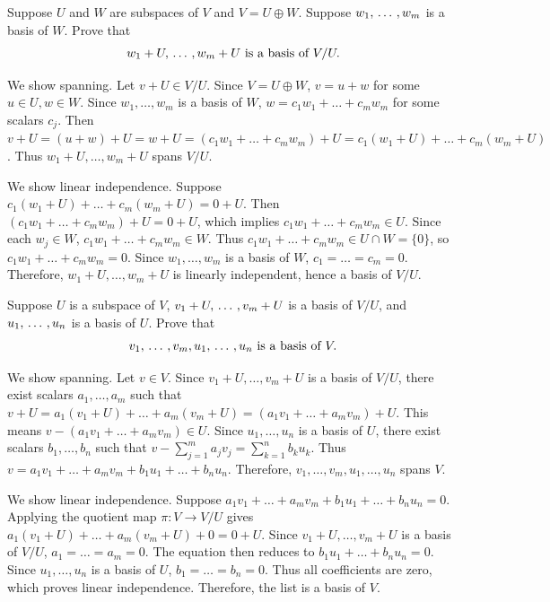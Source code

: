 \begin{xrcs}
  Suppose $U$ and $W$ are subspaces of $V$ and $V = U \oplus W$. Suppose $w_1, {\, \ldots \,\,}, w_m$ is a basis of $W$. Prove that
  \begin{equation}
    w_1 + U, {\, \ldots \,\,}, w_m + U \text{ is a basis of } V/U.
  \end{equation}

\begin{xprf}
  \StepOne We show spanning. Let $v + U \in V/U$. Since $V = U \oplus W$, $v = u + w$ for some $u \in U, w \in W$.
  Since $w_1, \dots, w_m$ is a basis of $W$, $w = c_1 w_1 + \dots + c_m w_m$ for some scalars $c_j$.
  Then $v + U = (u + w) + U = w + U = (c_1 w_1 + \dots + c_m w_m) + U = c_1(w_1+U) + \dots + c_m(w_m+U)$.
  Thus $w_1+U, \dots, w_m+U$ spans $V/U$.

  \StepTwo We show linear independence. Suppose $c_1(w_1+U) + \dots + c_m(w_m+U) = 0 + U$.
  Then $(c_1 w_1 + \dots + c_m w_m) + U = 0 + U$, which implies $c_1 w_1 + \dots + c_m w_m \in U$.
  Since each $w_j \in W$, $c_1 w_1 + \dots + c_m w_m \in W$.
  Thus $c_1 w_1 + \dots + c_m w_m \in U \cap W = \{0\}$, so $c_1 w_1 + \dots + c_m w_m = 0$.
  Since $w_1, \dots, w_m$ is a basis of $W$, $c_1 = \dots = c_m = 0$.
  Therefore, $w_1+U, \dots, w_m+U$ is linearly independent, hence a basis of $V/U$.
\end{xprf}
\end{xrcs}

\begin{xrcs}
  Suppose $U$ is a subspace of $V$, $v_1 + U, {\, \ldots \,\,}, v_m + U$ is a basis of $V/U$, and $u_1, {\, \ldots \,\,}, u_n$ is a basis of $U$. Prove that
  \begin{equation}
    v_1, {\, \ldots \,\,}, v_m, u_1, {\, \ldots \,\,}, u_n \text{ is a basis of } V.
  \end{equation}

\begin{xprf}
  \StepOne We show spanning. Let $v \in V$.
  Since $v_1+U, \dots, v_m+U$ is a basis of $V/U$, there exist scalars $a_1, \dots, a_m$ such that $v + U = a_1(v_1+U) + \dots + a_m(v_m+U) = (a_1 v_1 + \dots + a_m v_m) + U$.
  This means $v - (a_1 v_1 + \dots + a_m v_m) \in U$.
  Since $u_1, \dots, u_n$ is a basis of $U$, there exist scalars $b_1, \dots, b_n$ such that $v - \sum_{j=1}^m a_j v_j = \sum_{k=1}^n b_k u_k$.
  Thus $v = a_1 v_1 + \dots + a_m v_m + b_1 u_1 + \dots + b_n u_n$.
  Therefore, $v_1, \dots, v_m, u_1, \dots, u_n$ spans $V$.

  \StepTwo We show linear independence. Suppose $a_1 v_1 + \dots + a_m v_m + b_1 u_1 + \dots + b_n u_n = 0$.
  Applying the quotient map $\pi: V \to V/U$ gives $a_1(v_1+U) + \dots + a_m(v_m+U) + 0 = 0 + U$.
  Since $v_1+U, \dots, v_m+U$ is a basis of $V/U$, $a_1 = \dots = a_m = 0$.
  The equation then reduces to $b_1 u_1 + \dots + b_n u_n = 0$.
  Since $u_1, \dots, u_n$ is a basis of $U$, $b_1 = \dots = b_n = 0$.
  Thus all coefficients are zero, which proves linear independence.
  Therefore, the list is a basis of $V$.
\end{xprf}
\end{xrcs}
